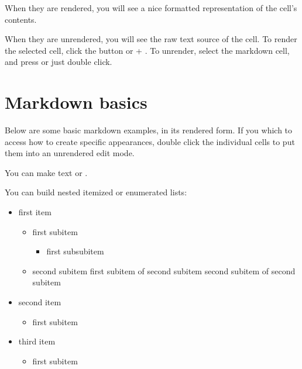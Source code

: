 \documentclass[letterpaper,10pt,english]{sphinxmanual}
\begin{document}
\sphinxAtStartPar
When they are rendered, you will see a nice formatted representation of the cell’s contents.

\sphinxAtStartPar
When they are unrendered, you will see the raw text source of the cell. To render the selected cell, click the  button or + . To unrender, select the markdown cell, and press  or just double click.


\section{Markdown basics}
\label{\detokenize{notebooks/Intro/EditCells:Markdown-basics}}
\sphinxAtStartPar
Below are some basic markdown examples, in its rendered form. If you which to access how to create specific appearances, double click the individual cells to put them into an unrendered edit mode.

\sphinxAtStartPar
You can make text  or .

\sphinxAtStartPar
You can build nested itemized or enumerated lists:
\begin{itemize}
\item {} 
\sphinxAtStartPar
first item
\begin{itemize}
\item {} 
\sphinxAtStartPar
first subitem
\begin{itemize}
\item {} 
\sphinxAtStartPar
first subsubitem

\end{itemize}

\item {} 
\sphinxAtStartPar
second subitem \sphinxhyphen{} first subitem of second subitem \sphinxhyphen{} second subitem of second subitem

\end{itemize}

\item {} 
\sphinxAtStartPar
second item
\begin{itemize}
\item {} 
\sphinxAtStartPar
first subitem

\end{itemize}

\item {} 
\sphinxAtStartPar
third item
\begin{itemize}
\item {} 
\sphinxAtStartPar
first subitem

\end{itemize}

\end{itemize}
\end{document}
